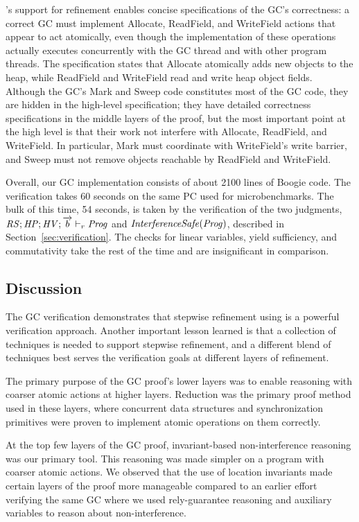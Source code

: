 \civl's support for refinement enables concise specifications of the GC's correctness:
a correct GC must implement Allocate, ReadField, and WriteField actions that appear to act atomically,
even though the implementation of these operations actually executes concurrently with the GC thread and with other program threads.
The specification states that Allocate atomically adds new objects to the heap,
while ReadField and WriteField read and write heap object fields.
Although the GC's Mark and Sweep code constitutes most of the GC code,
they are hidden in the high-level specification;
they have detailed correctness specifications in the middle layers of the proof,
but the most important point at the high level is that their work not interfere with Allocate, ReadField, and WriteField.
In particular, Mark must coordinate with WriteField's write barrier,
and Sweep must not remove objects reachable by ReadField and WriteField.

Overall, our GC implementation consists of about 2100 lines of Boogie code.
The verification takes 60 seconds on the same PC used for microbenchmarks.
The bulk of this time, 54 seconds, is taken by the verification of the two judgments,
$\mathit{RS};\mathit{HP};\mathit{HV};\overrightarrow{b} \vdash_r \mathit{Prog}$ and $\mathit{InterferenceSafe}(\mathit{Prog})$, described in Section~\ref{sec:verification}.
The checks for linear variables, yield sufficiency, and commutativity take the rest of the time and are insignificant in comparison.

\subsection{Discussion}
The GC verification demonstrates that stepwise refinement using \civl is a
powerful verification approach. 
Another important lesson learned is that a collection
of techniques is needed to support stepwise refinement, and a different blend of
techniques best serves the verification goals at different layers of refinement. 

The primary purpose of the GC proof's lower layers was to enable
reasoning with coarser atomic actions at higher layers. 
Reduction was the primary proof method used in these layers, where
concurrent data structures and synchronization primitives were proven
to implement atomic operations on them correctly. 

At the top few layers of the GC proof, invariant-based
non-interference reasoning was our primary tool. 
This reasoning was made simpler on a program with coarser
atomic actions. 
We observed that the use
of location invariants made certain layers of the proof more
manageable compared to an earlier effort verifying the same GC where we used
rely-guarantee reasoning and auxiliary variables to reason about
non-interference.  

